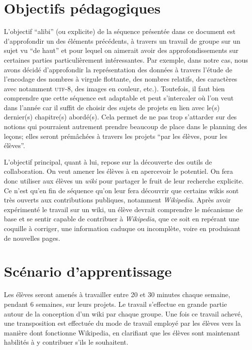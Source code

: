 \documentclass[11pt,bibliography=totoc]{scrartcl}
\begin{document}
\section{Objectifs pédagogiques}
L'objectif ``alibi'' (ou explicite) de la séquence présentée dans ce document
est d'approfondir un des éléments précédents, à travers un travail de groupe sur
un sujet vu ``de haut'' et pour lequel on aimerait avoir des approfondissements
sur certaines parties particulièrement intéressantes.  Par exemple, dans notre
cas, nous avons décidé d'approfondir la représentation des données à travers
l'étude de l'encodage des nombres à virgule flottante, des nombres relatifs, des
caractères avec notamment \textsc{utf}-8, des images en couleur, etc.).
Toutefois, il faut bien comprendre que cette séquence est adaptable et peut
s'intercaler où l'on veut dans l'année car il suffit de choisir des sujets de
projets en lien avec le(s) dernier(s) chapitre(s) abordé(s). Cela permet de ne
pas trop s'attarder sur des notions qui pourraient autrement prendre beaucoup de
place dans le planning des leçons; elles seront prémâchées à travers les projets
``par les élèves, pour les élèves''.

L'objectif principal, quant à lui, repose sur la découverte des outils de
collaboration. On veut amener les élèves à en apercevoir le potentiel.  On fera
donc utiliser aux élèves un \textit{wiki} pour partager le fruit de leur
recherche explicite.  Ce n'est qu'en fin de séquence qu'on leur fera découvrir
que certains wikis sont très ouverts aux contributions publiques, notamment
\textit{Wikipedia}.  Après avoir expérimenté le travail sur un wiki, un élève
devrait comprendre le mécanisme de base et se sentir capable de contribuer à
\textit{Wikipedia}, que ce soit en repérant une coquille à corriger, une
information caduque ou incomplète, voire en produisant de nouvelles pages.


\section{Scénario d'apprentissage}
Les élèves seront amenés à travailler entre 20 et 30 minutes chaque semaine,
pendant 6 semaines, sur leurs projets. Le travail s'effectue en grande partie
autour de la conception d'un wiki par chaque groupe. Une fois ce travail achevé,
une transposition est effectuée du mode de travail employé par les élèves vers
la manière dont fonctionne Wikipedia, en clarifiant que les élèves sont
maintenant habilités à y contribuer s'ils le souhaitent.
\end{document}
